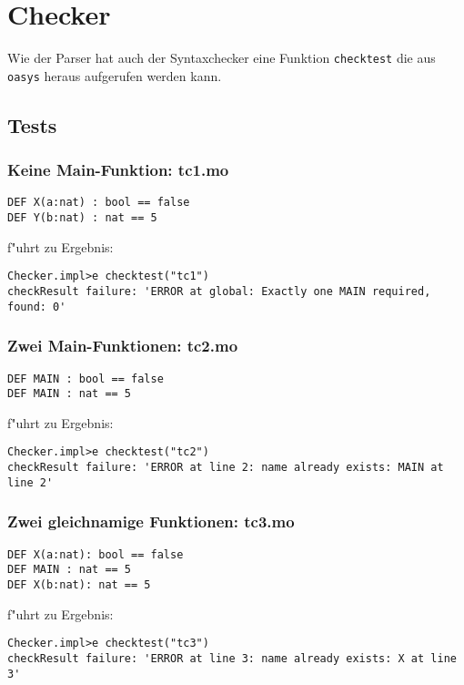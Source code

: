 \documentclass[a4paper,12pt]{report}
\begin{document}
\chapter{Checker}
Wie der Parser hat auch der Syntaxchecker eine Funktion \texttt{checktest} die aus \texttt{oasys} heraus aufgerufen werden kann.

\section{Tests}
\subsection{Keine Main-Funktion: tc1.mo}
\begin{verbatim}
DEF X(a:nat) : bool == false
DEF Y(b:nat) : nat == 5
\end{verbatim}
f"uhrt zu Ergebnis:
\begin{verbatim}
Checker.impl>e checktest("tc1")
checkResult failure: 'ERROR at global: Exactly one MAIN required, found: 0'
\end{verbatim}

\subsection{Zwei Main-Funktionen: tc2.mo}
\begin{verbatim}
DEF MAIN : bool == false
DEF MAIN : nat == 5
\end{verbatim}
f"uhrt zu Ergebnis:
\begin{verbatim}
Checker.impl>e checktest("tc2")
checkResult failure: 'ERROR at line 2: name already exists: MAIN at line 2'
\end{verbatim}

\subsection{Zwei gleichnamige Funktionen: tc3.mo}
\begin{verbatim}
DEF X(a:nat): bool == false
DEF MAIN : nat == 5
DEF X(b:nat): nat == 5
\end{verbatim}
f"uhrt zu Ergebnis:
\begin{verbatim}
Checker.impl>e checktest("tc3")
checkResult failure: 'ERROR at line 3: name already exists: X at line 3'
\end{verbatim}
\end{document}
